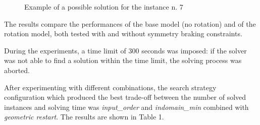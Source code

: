 \begin{figure}[!tbp]
  \centering
  \hfill
  \hfill
  \caption{Example of a possible solution for the instance n. 7}
\end{figure}


The results compare the performances of the base model (no rotation) and of the rotation model, both tested with and without symmetry braking constraints.

During the experiments, a time limit of 300 seconds was imposed: if the solver was not able to find a solution within the time limit, the solving process was aborted.

After experimenting with different combinations, the search strategy configuration which produced the best trade-off between the number of solved instances and solving time was \textit{input\_order} and \textit{indomain\_min} combined with \textit{geometric restart}. The results are shown in Table 1.


